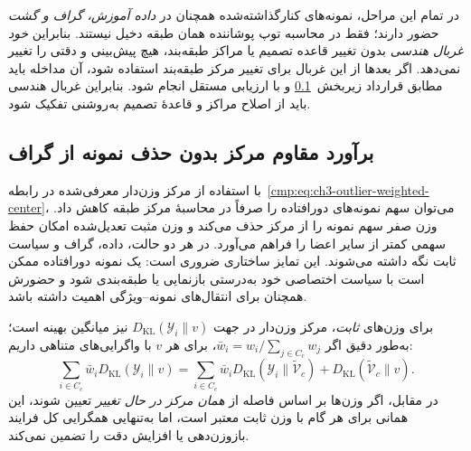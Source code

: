 در تمام این مراحل، نمونه‌های
کنارگذاشته‌شده همچنان در
\emph{داده آموزش، گراف و گشت}
حضور دارند؛ فقط در محاسبه
توپ پوشاننده همان طبقه دخیل نیستند.
بنابراین \emph{خود غربال هندسی}
بدون تغییر قاعده تصمیم یا مراکز
طبقه‌بند، هیچ پیش‌بینی و دقتی
را تغییر نمی‌دهد.
اگر بعدها از این غربال برای
تغییر مرکز طبقه‌بند استفاده شود،
آن مداخله باید مطابق قرارداد
زیربخش~\ref{cmp:subsec:ch3-outlier-robust-centers}
و با ارزیابی مستقل انجام شود.
بنابراین غربال هندسی باید
از اصلاح مراکز و قاعدهٔ تصمیم
به‌روشنی تفکیک شود.


\subsection{برآورد مقاوم مرکز بدون حذف نمونه از گراف}
\label{cmp:subsec:ch3-outlier-robust-centers}
با استفاده از مرکز وزن‌دار معرفی‌شده در
رابطه~\eqref{cmp:eq:ch3-outlier-weighted-center}،
می‌توان سهم نمونه‌های دورافتاده را صرفاً در
محاسبهٔ مرکز طبقه کاهش داد. وزن صفر سهم نمونه
را از مرکز حذف می‌کند و وزن مثبت تعدیل‌شده
امکان حفظ سهمی کمتر از سایر اعضا را فراهم
می‌آورد. در هر دو حالت، داده، گراف و سیاست
ثابت نگه داشته می‌شوند.
این تمایز ساختاری ضروری است: یک نمونه دورافتاده
ممکن است با سیاست اختصاصی خود به‌درستی
بازنمایی یا طبقه‌بندی شود و حضورش همچنان
برای انتقال‌های نمونه--ویژگی اهمیت داشته باشد.

برای وزن‌های \emph{ثابت}، مرکز وزن‌دار در جهت
$D_{\mathrm{KL}}(\mathscr Y_i\|v)$ نیز
میانگین بهینه است؛ به‌طور دقیق اگر
$\bar w_i=w_i/\sum_{j\in C_c}w_j$،
برای هر $v$ با واگرایی‌های متناهی داریم:
\begin{equation}\label{cmp:eq:ch3-outlier-weighted-kl-decomposition}
\sum_{i\in C_c}\bar w_i
D_{\mathrm{KL}}(\mathscr Y_i\|v)
=
\sum_{i\in C_c}\bar w_i
D_{\mathrm{KL}}(\mathscr Y_i\|
\widetilde{\mathcal V}_c)
+
D_{\mathrm{KL}}(\widetilde{\mathcal V}_c\|v).
\end{equation}
در مقابل، اگر وزن‌ها بر اساس فاصله از
\emph{همان مرکز در حال تغییر} تعیین شوند،
این همانی برای هر گام با وزن ثابت معتبر است،
اما به‌تنهایی همگرایی کل فرایند بازوزن‌دهی
یا افزایش دقت را تضمین نمی‌کند.

